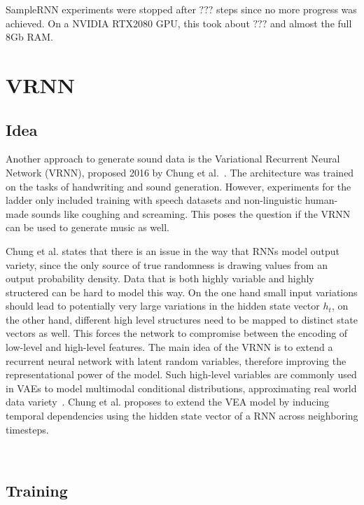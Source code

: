 \documentclass[12pt]{article}
\begin{document}
SampleRNN experiments were stopped after $???$ steps since no more progress was achieved.
On a NVIDIA RTX2080 GPU, this took about $???$ and almost the full 8Gb RAM.





\section{VRNN}

\subsection{Idea}
Another approach to generate sound data is the Variational Recurrent Neural Network (VRNN), proposed 2016 by Chung et al.~\cite{chung2015recurrent}.
The architecture was trained on the tasks of handwriting and sound generation.
However, experiments for the ladder only included training with speech datasets and non-linguistic human-made sounds like coughing and screaming.
This poses the question if the VRNN can be used to generate music as well.

Chung et al. states that there is an issue in the way that RNNs model output variety, since the only source of true randomness is drawing values from an output probability density.
Data that is both highly variable and highly structered can be hard to model this way.
On the one hand small input variations should lead to potentially very large variations in the hidden state vector $h_t$, on the other hand, different high level structures need to be mapped to distinct state vectors as well.
This forces the network to compromise between the encoding of low-level and high-level features.
The main idea of the VRNN is to extend a recurrent neural network with latent random variables, therefore improving the representational power of the model.
Such high-level variables are commonly used in VAEs to model multimodal conditional distributions, approximating real world data variety~\cite{kingma2013auto}.
Chung et al. proposes to extend the VEA model by inducing temporal dependencies using the hidden state vector of a RNN across neighboring timesteps.



 



\subsection{Training}
\end{document}
